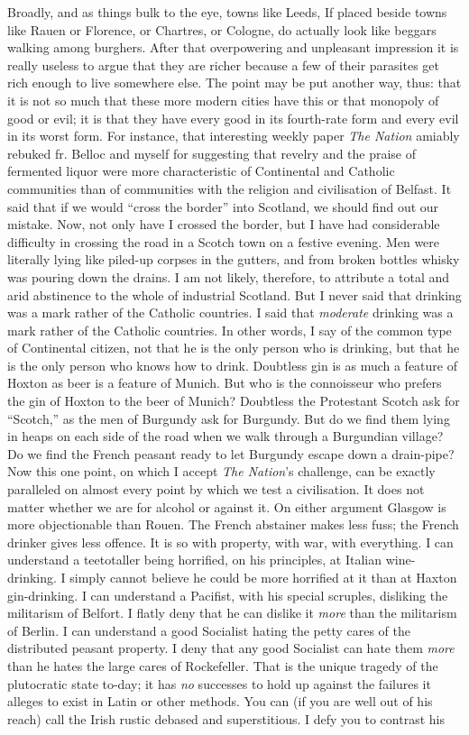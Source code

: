 \documentclass{book}
\begin{document}
Broadly, and as things bulk to the eye, towns like Leeds, If placed beside towns like Rauen or Florence, or Chartres, or Cologne, do actually look like beggars walking among burghers. After that overpowering and unpleasant impression it is really useless to argue that they are richer because a few of their parasites get rich enough to live somewhere else. The point may be put another way, thus: that it is not so much that these more modern cities have this or that monopoly of good or evil; it is that they have every good in its fourth-rate form and every evil in its worst form. For instance, that interesting weekly paper \emph{The Nation} amiably rebuked fr. Belloc and myself for suggesting that revelry and the praise of fermented liquor were more characteristic of Continental and Catholic communities than of communities with the religion and civilisation of Belfast. It said that if we would “cross the border” into Scotland, we should find out our mistake. Now, not only have I crossed the border, but I have had considerable difficulty in crossing the road in a Scotch town on a festive evening. Men were literally lying like piled-up corpses in the gutters, and from broken bottles whisky was pouring down the drains. I am not likely, therefore, to attribute a total and arid abstinence to the whole of industrial Scotland. But I never said that drinking was a mark rather of the Catholic countries. I said that \emph{moderate} drinking was a mark rather of the Catholic countries. In other words, I say of the common type of Continental citizen, not that he is the only person who is drinking, but that he is the only person who knows how to drink. Doubtless gin is as much a feature of Hoxton as beer is a feature of Munich. But who is the connoisseur who prefers the gin of Hoxton to the beer of Munich? Doubtless the Protestant Scotch ask for “Scotch,” as the men of Burgundy ask for Burgundy. But do we find them lying in heaps on each side of the road when we walk through a Burgundian village? Do we find the French peasant ready to let Burgundy escape down a drain-pipe? Now this one point, on which I accept \emph{The Nation}’s challenge, can be exactly paralleled on almost every point by which we test a civilisation. It does not matter whether we are for alcohol or against it. On either argument Glasgow is more objectionable than Rouen. The French abstainer makes less fuss; the French drinker gives less offence. It is so with property, with war, with everything. I can understand a teetotaller being horrified, on his principles, at Italian wine-drinking. I simply cannot believe he could be more horrified at it than at Haxton gin-drinking. I can understand a Pacifist, with his special scruples, disliking the militarism of Belfort. I flatly deny that he can dislike it \emph{more} than the militarism of Berlin. I can understand a good Socialist hating the petty cares of the distributed peasant property. I deny that any good Socialist can hate them \emph{more} than he hates the large cares of Rockefeller. That is the unique tragedy of the plutocratic state to-day; it has \emph{no} successes to hold up against the failures it alleges to exist in Latin or other methods. You can (if you are well out of his reach) call the Irish rustic debased and superstitious. I defy you to contrast his 
\end{document}
